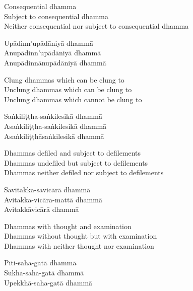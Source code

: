 \begin{english-verses}
  Consequential dhamma\\
  Subject to consequential dhamma\\
  Neither consequential nor subject to consequential dhamma
\end{english-verses}

\begin{pali-hang-continued}
Upādinn'upādāniyā dhammā\\
Anupādinn'upādāniyā dhammā\\
Anupādinnānupādāniyā dhammā
\end{pali-hang-continued}

\begin{english-verses}
  Clung dhammas which can be clung to\\
  Unclung dhammas which can be clung to\\
  Unclung dhammas which cannot be clung to
\end{english-verses}

\begin{pali-hang-continued}
Saṅkiliṭṭha-saṅkilesikā dhammā\\
Asaṅkiliṭṭha-saṅkilesikā dhammā\\
Asaṅkiliṭṭhāsaṅkilesikā dhammā
\end{pali-hang-continued}

\begin{english-verses}
  Dhammas defiled and subject to defilements\\
  Dhammas undefiled but subject to defilements\\
  Dhammas neither defiled nor subject to defilements
\end{english-verses}

\begin{pali-hang-continued}
Savitakka-savicārā dhammā\\
Avitakka-vicāra-mattā dhammā\\
Avitakkāvicārā dhammā
\end{pali-hang-continued}

\begin{english-verses}
  Dhammas with thought and examination\\
  Dhammas without thought but with examination\\
  Dhammas with neither thought nor examination
\end{english-verses}

\begin{pali-hang-continued}
Pīti-saha-gatā dhammā\\
Sukha-saha-gatā dhammā\\
Upekkhā-saha-gatā dhammā
\end{pali-hang-continued}

